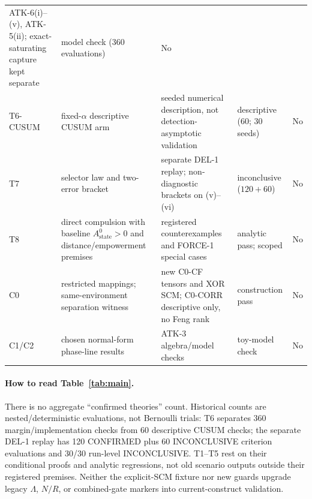 \begin{table}[htbp]
\begin{tabularx}{\textwidth}{@{}l >{\raggedright\arraybackslash}X
>{\raggedright\arraybackslash}X >{\raggedright\arraybackslash}p{} l@{}}
ATK-6(i)--(v), ATK-5(ii); exact-saturating capture kept separate & model check (360 evaluations) & No \\
T6-CUSUM & fixed-$\alpha$ descriptive CUSUM arm & seeded numerical description,
not detection-asymptotic validation & descriptive (60; 30 seeds) & No \\
T7 & selector law and two-error bracket & separate DEL-1 replay;
non-diagnostic brackets on (v)--(vi) & inconclusive ($120+60$) & No \\
T8 & direct compulsion with baseline $A_{\mathrm{state}}^0>0$ and distance/empowerment premises &
registered counterexamples and FORCE-1 special cases & analytic pass; scoped & No \\
C0 & restricted mappings; same-environment separation witness &
new C0-CF tensors and XOR SCM; C0-CORR descriptive only, no Feng rank & construction pass & No \\
C1/C2 & chosen normal-form phase-line results & ATK-3 algebra/model checks & toy-model check & No \\
\bottomrule
\end{tabularx}
\end{table}

\paragraph{How to read Table~\ref{tab:main}.}
There is no aggregate ``confirmed theories'' count. Historical counts are
nested/deterministic evaluations, not Bernoulli trials: T6 separates 360
margin/implementation checks from 60 descriptive CUSUM checks; the separate
DEL-1 replay has 120 CONFIRMED plus 60 INCONCLUSIVE criterion evaluations and
30/30 run-level INCONCLUSIVE. T1--T5 rest on their conditional proofs and
analytic regressions, not old scenario outputs outside their registered
premises. Neither the explicit-SCM fixture nor new guards upgrade legacy
$\Lambda$, $N/R$, or combined-gate markers into current-construct validation.

